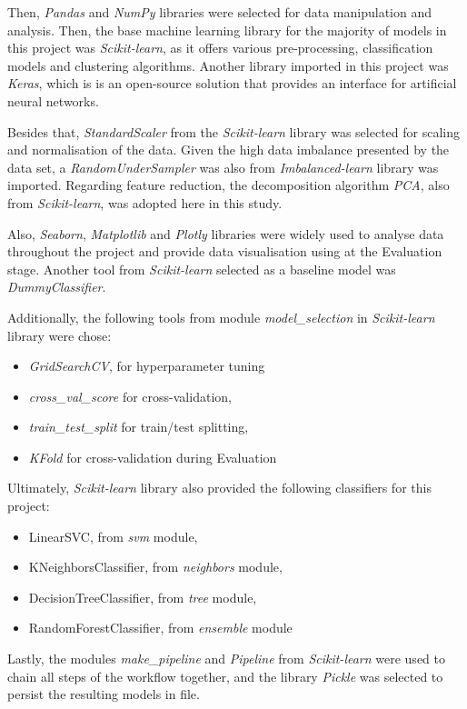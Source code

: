\documentclass{article}
\begin{document}
Then, \emph{Pandas} and \emph{NumPy} libraries were selected for data manipulation and analysis. Then, the base machine learning library for the majority of models in this project was \emph{Scikit-learn}, as it offers various pre-processing, classification models and clustering algorithms. Another library imported in this project was \emph{Keras}, which is is an open-source solution that provides an interface for artificial neural networks.

Besides that, \emph{StandardScaler} from the \emph{Scikit-learn} library was selected for scaling and normalisation of the data. Given the high data imbalance presented by the data set, a \emph{RandomUnderSampler} was also from \emph{Imbalanced-learn} library was imported. Regarding feature reduction, the decomposition algorithm \emph{PCA}, also from \emph{Scikit-learn}, was adopted here in this study. 

Also, \emph{Seaborn}, \emph{Matplotlib} and \emph{Plotly} libraries were widely used to analyse data throughout the project and provide data visualisation using at the Evaluation stage. Another tool from \emph{Scikit-learn} selected as a baseline model was \emph{DummyClassifier}. 

Additionally, the following tools from module \emph{model\_selection} in \emph{Scikit-learn} library were chose:

\begin{itemize}
    \item \emph{GridSearchCV}, for hyperparameter tuning
    \item \emph{cross\_val\_score} for cross-validation, 
    \item \emph{train\_test\_split} for train/test splitting,
    \item \emph{KFold} for cross-validation during Evaluation
\end{itemize}

Ultimately, \emph{Scikit-learn} library also provided the following classifiers for this project:
\begin{itemize}
    \item LinearSVC, from \emph{svm} module,
    \item KNeighborsClassifier, from \emph{neighbors} module,
    \item DecisionTreeClassifier, from \emph{tree} module,
    \item RandomForestClassifier, from \emph{ensemble} module
\end{itemize}

Lastly, the modules \emph{make\_pipeline} and \emph{Pipeline} from \emph{Scikit-learn} were used to chain all steps of the workflow together, and the library \emph{Pickle} was selected to persist the resulting models in file.
\end{document}

